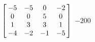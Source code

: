 {$\left[\hskip -3pt \begin{array}{cccc} -5&-5&0&-2\\  0&0&5&0
\\  1&3&3&1\\  -4&-2&-1&-5\end{array}\hskip -3pt \right]$} 
{$-200$}



  

